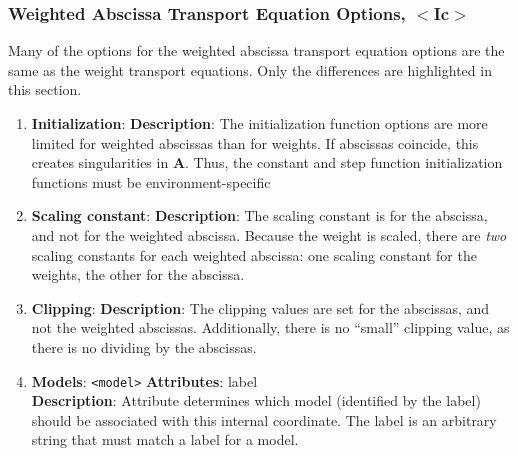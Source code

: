 \subsubsection{Weighted Abscissa Transport Equation Options, $<$Ic$>$}
%
Many of the options for the weighted abscissa transport equation options are the same as the weight transport equations. Only the differences are highlighted in this section.
%
\begin{enumerate}
%
\item {\bf Initialization}:
{\bf Description}: The initialization function options are more limited for weighted abscissas than for weights. If abscissas coincide, this creates singularities in $\mathbf{A}$. Thus, the constant and step function initialization functions must be environment-specific
%
\item {\bf Scaling constant}:
{\bf Description}: The scaling constant is for the abscissa, and not for the weighted abscissa. Because the weight is scaled, there are {\it two} scaling constants for each weighted abscissa: one scaling constant for the weights, the other for the abscissa.
%
\item {\bf Clipping}:
{\bf Description}: The clipping values are set for the abscissas, and not the weighted abscissas.  Additionally, there is no ``small'' clipping value, as there is no dividing by the abscissas.
%
\item {\bf Models}: \verb=<model>=
{\bf Attributes}: label \\
{\bf Description}: Attribute determines which model (identified by the label) should be associated with this internal coordinate. The label is an arbitrary string that must match a label for a model.
%
\end{enumerate}



